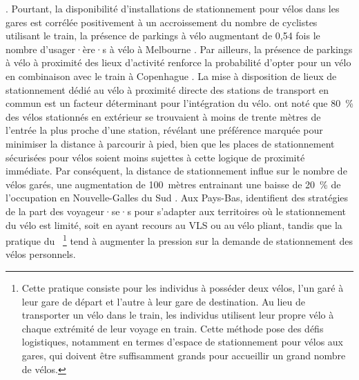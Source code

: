\begin{refsegment}
{} \textcolor{blue}{\autocite[400]{la_paix_puello_integration_2016}}. Pourtant, la disponibilité d'installations de stationnement pour vélos dans les gares est corrélée positivement à un accroissement du nombre de cyclistes utilisant le train, la présence de parkings à vélo augmentant de 0,54 fois le nombre d'usager·ère·s à vélo à Melbourne \textcolor{blue}{\autocite[401]{weliwitiya_bicycle_2019}}. Par ailleurs, la présence de parkings à vélo à proximité des lieux d'activité renforce la probabilité d'opter pour un vélo en combinaison avec le train à Copenhague \textcolor{blue}{\autocite[24]{halldorsdottir_home-end_2017}}. La mise à disposition de lieux de stationnement dédié au vélo à proximité directe des stations de transport en commun est un facteur déterminant pour l'intégration du vélo. \textcolor{blue}{\textcite[8, 19]{arbis_analysis_2016}} ont noté que 80~\% des vélos stationnés en extérieur se trouvaient à moins de trente mètres de l'entrée la plus proche d'une station, révélant une préférence marquée pour minimiser la distance à parcourir à pied, bien que les places de stationnement sécurisées pour vélos soient moins sujettes à cette logique de proximité immédiate. Par conséquent, la distance de stationnement influe sur le nombre de vélos garés, une augmentation de 100~mètres entrainant une baisse de 20~\% de l'occupation en Nouvelle-Galles du Sud \textcolor{blue}{\autocite[15]{arbis_analysis_2016}}. Aux Pays-Bas, \textcolor{blue}{\textcite[10]{jonkeren_bicycle_2021}} identifient des stratégies de la part des voyageur·se·s pour s'adapter aux territoires où le stationnement du vélo est limité, soit en ayant recours au \acrshort{VLS} ou au vélo pliant, tandis que la pratique du ~\footnote{
    Cette pratique consiste pour les individus à posséder deux vélos, l'un garé à leur gare de départ et l'autre à leur gare de destination. Au lieu de transporter un vélo dans le train, les individus utilisent leur propre vélo à chaque extrémité de leur voyage en train. Cette méthode pose des défis logistiques, notamment en termes d'espace de stationnement pour vélos aux gares, qui doivent être suffisamment grands pour accueillir un grand nombre de vélos.
} tend à augmenter la pression sur la demande de stationnement des vélos personnels.%


\end{refsegment}
